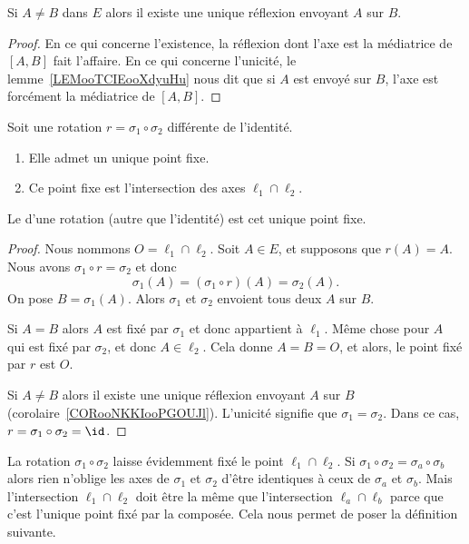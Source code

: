 \begin{corollary}       \label{CORooNKKIooPGOUJl}
	Si \( A\neq B\) dans \( E\) alors il existe une unique réflexion envoyant \( A\) sur \( B\).
\end{corollary}

\begin{proof}
	En ce qui concerne l'existence, la réflexion dont l'axe est la médiatrice de \( [A,B]\) fait l'affaire. En ce qui concerne l'unicité, le lemme~\ref{LEMooTCIEooXdyuHu} nous dit que si \( A\) est envoyé sur \( B\), l'axe est forcément la médiatrice de \( [A,B]\).
\end{proof}

\begin{lemmaDef}        \label{LEMooIJELooLWqBfE}
	Soit une rotation \( r=\sigma_1\circ\sigma_2\) différente de l'identité.
	\begin{enumerate}
		\item
		      Elle admet un unique point fixe.
		\item
		      Ce point fixe est l'intersection des axes \( \ell_1\cap\ell_2\).
	\end{enumerate}

	Le  d'une rotation (autre que l'identité) est cet unique point fixe.
\end{lemmaDef}

\begin{proof}
	Nous nommons \( O=\ell_1\cap\ell_2\). Soit \( A\in E\), et supposons que \( r(A)=A\). Nous avons \( \sigma_1\circ r=\sigma_2\) et donc
	\begin{equation}
		\sigma_1(A)=(\sigma_1\circ r)(A)=\sigma_2(A).
	\end{equation}
	On pose \( B=\sigma_1(A)\). Alors \( \sigma_1\) et \( \sigma_2\) envoient tous deux \( A\) sur \( B\).

	Si \( A=B\) alors \( A\) est fixé par \( \sigma_1\) et donc appartient à \( \ell_1\). Même chose pour \( A\) qui est fixé par \( \sigma_2\), et donc \( A\in\ell_2\). Cela donne \( A=B=O\), et alors, le point fixé par \( r\) est \( O\).

	Si \( A\neq B\) alors il existe une unique réflexion envoyant \( A\) sur \( B\) (corolaire~\ref{CORooNKKIooPGOUJl}). L'unicité signifie que \( \sigma_1=\sigma_2\). Dans ce cas, \( r=\sigma_1\circ\sigma_2=\id\).
\end{proof}

\begin{normaltext}      \label{NORMooDPBOooKkRuTn}
	La rotation \( \sigma_1\circ\sigma_2\) laisse évidemment fixé le point \( \ell_1\cap \ell_2\). Si \( \sigma_1\circ\sigma_2=\sigma_a\circ\sigma_b\) alors rien n'oblige les axes de \( \sigma_1\) et \( \sigma_2\) d'être identiques à ceux de \( \sigma_a\) et \( \sigma_b\). Mais l'intersection \( \ell_1\cap\ell_2\) doit être la même que l'intersection \( \ell_a\cap \ell_b\) parce que c'est l'unique point fixé par la composée. Cela nous permet de poser la définition suivante.
\end{normaltext}


